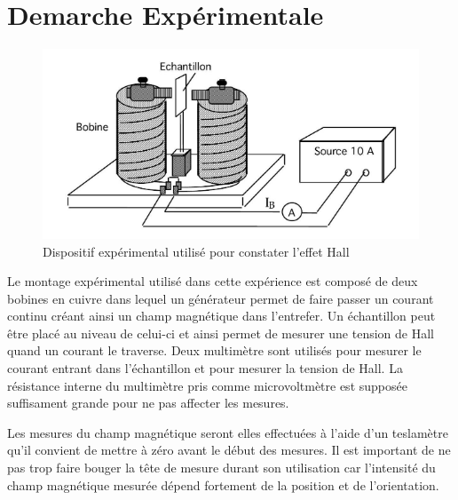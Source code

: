 \section{Demarche Expérimentale}


\begin{minipage}{\textwidth}
    \begin{figure}
        \centering
        \includegraphics[width=\linewidth]{figures/montage.png}
        \caption{Dispositif expérimental utilisé pour constater l'effet Hall \cite{notice}}
        \label{fig:montage}
        \vspace*{1cm}
    \end{figure}

    Le montage expérimental utilisé dans cette expérience est composé de deux bobines en cuivre dans lequel un générateur permet de faire passer un courant continu créant ainsi un champ magnétique dans l'entrefer. Un échantillon peut être placé au niveau de celui-ci et ainsi permet de mesurer une tension de Hall quand un courant le traverse. Deux multimètre sont utilisés pour mesurer le courant entrant dans l'échantillon et pour mesurer la tension de Hall. La résistance interne du multimètre pris comme microvoltmètre est supposée suffisament grande pour ne pas affecter les mesures.
\end{minipage}

Les mesures du champ magnétique seront elles effectuées à l'aide d'un teslamètre qu'il convient de mettre à zéro avant le début des mesures. Il est important de ne pas trop faire bouger la tête de mesure durant son utilisation car l'intensité du champ magnétique mesurée dépend fortement de la position et de l'orientation.

